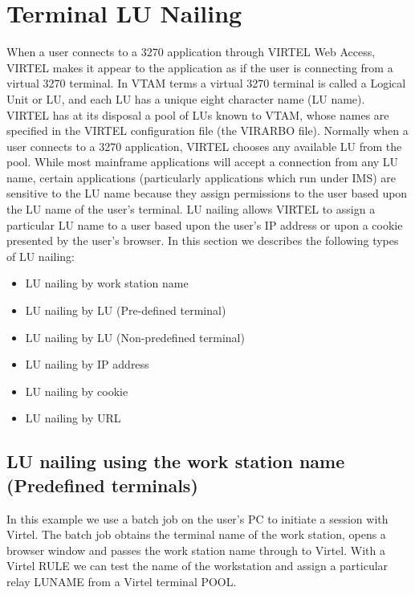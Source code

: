 \documentclass[letterpaper,10pt,english]{sphinxmanual}
\begin{document}
\chapter{Terminal LU Nailing}
\label{\detokenize{Customization:terminal-lu-nailing}}\label{\detokenize{Customization:index-56}}
When a user connects to a 3270 application through VIRTEL Web Access, VIRTEL makes it appear to the application as if the user is connecting from a virtual 3270 terminal. In VTAM terms a virtual 3270 terminal is called a Logical Unit or LU, and each LU has a unique eight character name (LU name). VIRTEL has at its disposal a pool of LUs known to VTAM,
whose names are specified in the VIRTEL configuration file (the VIRARBO file). Normally when a user connects to a 3270 application, VIRTEL chooses any available LU from the pool.
While most mainframe applications will accept a connection from any LU name, certain applications (particularly applications which run under IMS) are sensitive to the LU name because they assign permissions to the user based upon the LU name of the user’s terminal. LU nailing allows VIRTEL to assign a particular LU name to a user based upon the user’s IP address or upon a cookie presented by the user’s browser. In this section we describes the following types of LU nailing:
\begin{itemize}
\item {} 
LU nailing by work station name

\item {} 
LU nailing by LU (Pre-defined terminal)

\item {} 
LU nailing by LU (Non-predefined terminal)

\item {} 
LU nailing by IP address

\item {} 
LU nailing by cookie

\item {} 
LU nailing by URL

\end{itemize}

\ignorespaces 

\section{LU nailing using the work station name (Predefined terminals)}
\label{\detokenize{Customization:lu-nailing-using-the-work-station-name-predefined-terminals}}\label{\detokenize{Customization:index-57}}
In this example we use a batch job on the user’s PC to initiate a session with Virtel. The batch job obtains the terminal name of the work station, opens a browser window and passes the work station name through to Virtel. With a Virtel RULE we can test the name of the workstation and assign a particular relay LUNAME from a Virtel terminal POOL.
\end{document}

